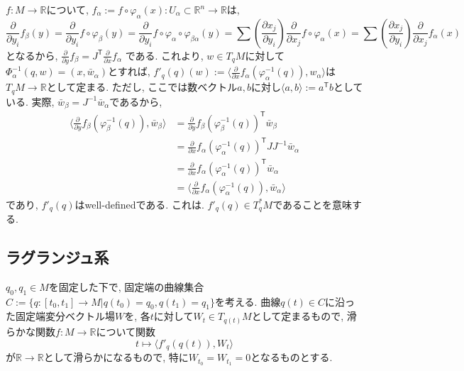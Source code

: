 \documentclass[a4paper]{ujarticle}
\numberwithin{equation}{section}
\theoremstyle{definition}
\begin{document}
        $f: M \rightarrow \mathbb{R}$について, $f_{\alpha} := f \circ \varphi_{\alpha}(x) : U_{\alpha} \subset \mathbb{R}^{n} \rightarrow \mathbb{R}$は,
        \[
            \frac{\partial}{\partial y_i} f_{\beta}(y)
            = \frac{\partial}{\partial y_i} f \circ \varphi_{\beta}(y) 
            = \frac{\partial}{\partial y_i} f \circ \varphi_{\alpha} \circ \varphi_{\beta \alpha}(y)
            = \sum \left(\frac{\partial x_j}{\partial y_i}\right) \frac{\partial}{\partial x_j}  f \circ \varphi_{\alpha}(x)
            = \sum \left(\frac{\partial x_j}{\partial y_i}\right) \frac{\partial}{\partial x_j}  f_{\alpha}(x)
        \]
        となるから, $\displaystyle \frac{\partial}{\partial y} f_{\beta} = J^{\mathsf{T}} \frac{\partial}{\partial x} f_{\alpha}$
        である. 
        これより, $w \in T_q M$に対して$\Phi^{-1}_{\alpha}(q, w) = (x, \bar{w}_{\alpha})$とすれば, 
        $\displaystyle f'_q(q)(w) := \langle \frac{\partial}{\partial x}f_{\alpha}(\varphi^{-1}_{\alpha}(q)), w_{\alpha} \rangle$は$T_q M \rightarrow \mathbb{R}$として定まる.
        ただし, ここでは数ベクトル$a, b$に対し$\langle a, b\rangle := a^{\mathsf{T}} b$としている.
        実際, $\bar{w}_{\beta} = J^{-1} \bar{w}_{\alpha}$であるから,
        \begin{align}
            \langle \frac{\partial}{\partial y}f_{\beta}(\varphi^{-1}_{\beta}(q)), \bar{w}_{\beta} \rangle
            &= \frac{\partial}{\partial y}f_{\beta}(\varphi^{-1}_{\beta}(q))^{\mathsf{T}} \bar{w}_{\beta} \\
            &= \frac{\partial}{\partial x}f_{\alpha}(\varphi^{-1}_{\alpha}(q))^{\mathsf{T}} J J^{-1} \bar{w}_{\alpha} \\
            &= \frac{\partial}{\partial x}f_{\alpha}(\varphi^{-1}_{\alpha}(q))^{\mathsf{T}} \bar{w}_{\alpha} \\
            &= \langle \frac{\partial}{\partial x}f_{\alpha}(\varphi^{-1}_{\alpha}(q)), \bar{w}_{\alpha} \rangle
        \end{align}
        であり, $f'_q(q)$はwell-definedである.
        これは. $f'_q(q) \in T^{*}_q M$であることを意味する.

        \subsection{ラグランジュ系}
        $q_0, q_1 \in M$を固定した下で, 固定端の曲線集合$C := \{q: [t_0, t_1] \rightarrow M | q(t_0) = q_0, q(t_1) = q_1\}$を考える.
        曲線$q(t) \in C$に沿った固定端変分ベクトル場$W$を, 各$t$に対して$W_t \in T_{q(t)} M$として定まるもので,
        滑らかな関数$f: M \rightarrow \mathbb{R}$について関数
        \[
                t \mapsto \langle f'_q(q(t)),  W_t\rangle
        \]
        が$\mathbb{R} \rightarrow \mathbb{R}$として滑らかになるもので, 特に$W_{t_0} = W_{t_1} = 0$となるものとする.
\end{document}
